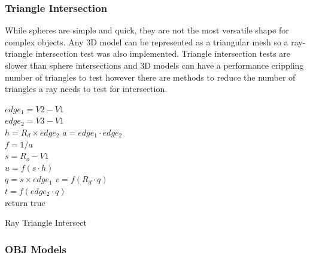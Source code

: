 \documentclass[final]{cmpreport}
\begin{document}
\subsubsection{Triangle Intersection}

While spheres are simple and quick, they are not the most versatile shape for complex objects. Any 3D model can be represented as a triangular mesh so a ray-triangle intersection test was also implemented. Triangle intersection tests are slower than sphere intersections and 3D models can have a performance crippling number of triangles to test however there are methods to reduce the number of triangles a ray needs to test for intersection.

\begin{algorithm}[H]
    \SetAlgoLined
    $edge_1 = V2 - V1$ \\
    $edge_2 = V3 - V1$ \\
    $h = R_d \times edge_2$ 
    $a = edge_1 \cdot edge_2$ \\
    $f = 1 / a$ \\
    $s = R_o - V1$ \\
    $u = f(s \cdot h)$ \\
    $q = s \times edge_1$ 
    $v = f(R_d \cdot q)$ \\
    $t = f(edge_2 \cdot q)$ \\
    return true

    \caption{Ray Triangle Intersect}
\end{algorithm}

\subsubsection{OBJ Models}
\end{document}
